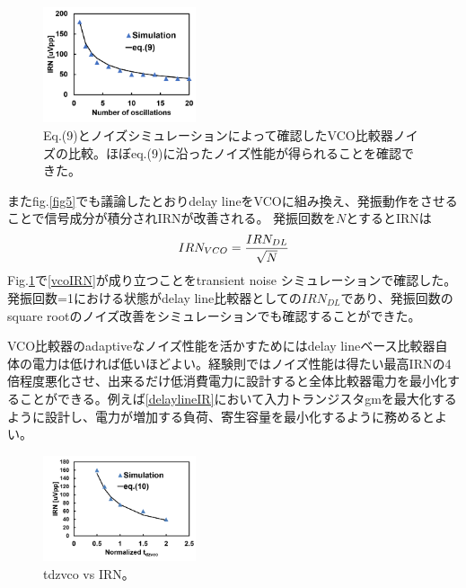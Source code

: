 \documentclass[letterpaper, 10 pt, conference]{ieeeconf}  %
\begin{document}
\begin{figure}[ht!]
\centering
 \includegraphics[width=0.4\textwidth]{figs/noc_noise.png}
  \captionsetup{font=footnotesize}
  \caption{Eq.(9)とノイズシミュレーションによって確認したVCO比較器ノイズの比較。ほぼeq.(9)に沿ったノイズ性能が得られることを確認できた。}
  \label{nocnoise}
\end{figure}

またfig.\ref{fig5}でも議論したとおりdelay lineをVCOに組み換え、発振動作をさせることで信号成分が積分されIRNが改善される。
発振回数を$N$とするとIRNは
\begin{eqnarray}
    \centering
    IRN_{VCO} = \frac{IRN_{DL}}{\sqrt{N}}
    \label{vcoIRN}
\end{eqnarray}
Fig.\ref{nocnoise}で\ref{vcoIRN}が成り立つことをtransient noise シミュレーションで確認した。発振回数=1における状態がdelay line比較器としての$IRN_{DL}$であり、発振回数のsquare rootのノイズ改善をシミュレーションでも確認することができた。

VCO比較器のadaptiveなノイズ性能を活かすためにはdelay lineベース比較器自体の電力は低ければ低いほどよい。経験則ではノイズ性能は得たい最高IRNの4倍程度悪化させ、出来るだけ低消費電力に設計すると全体比較器電力を最小化することができる。例えば\ref{delaylineIR}において入力トランジスタgmを最大化するように設計し、電力が増加する負荷、寄生容量を最小化するように務めるとよい。

\begin{figure}[ht!]
\centering
 \includegraphics[width=0.4\textwidth]{figs/tdzvco.png}
  \captionsetup{font=footnotesize}
  \caption{tdzvco vs IRN。}
  \label{tdzvco}
\end{figure}
\end{document}
